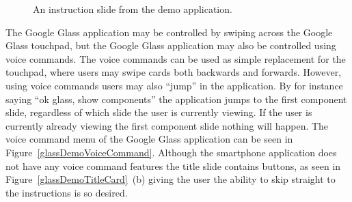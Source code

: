 	\begin{figure}[ht!]
		\centering
   		 \qquad
   		 \qquad
		\caption{An instruction slide from the demo application.}
		\label{glassDemoInstructionImage}
	\end{figure}
	
The Google Glass application may be controlled by swiping across the Google Glass touchpad, but the Google Glass application may also be controlled using voice commands. The voice commands can be used as simple replacement for the touchpad, where users may swipe cards both backwards and forwards. However, using voice commands users may also ``jump'' in the application. By for instance saying ``ok glass, show components'' the application jumps to the first component slide, regardless of which slide the user is currently viewing. If the user is currently already viewing the first component slide nothing will happen. The voice command menu of the Google Glass application can be seen in Figure~\ref{glassDemoVoiceCommand}. Although the smartphone application does not have any voice command features the title slide contains buttons, as seen in Figure~\ref{glassDemoTitleCard}~(b) giving the user the ability to skip straight to the instructions is so desired.
	
